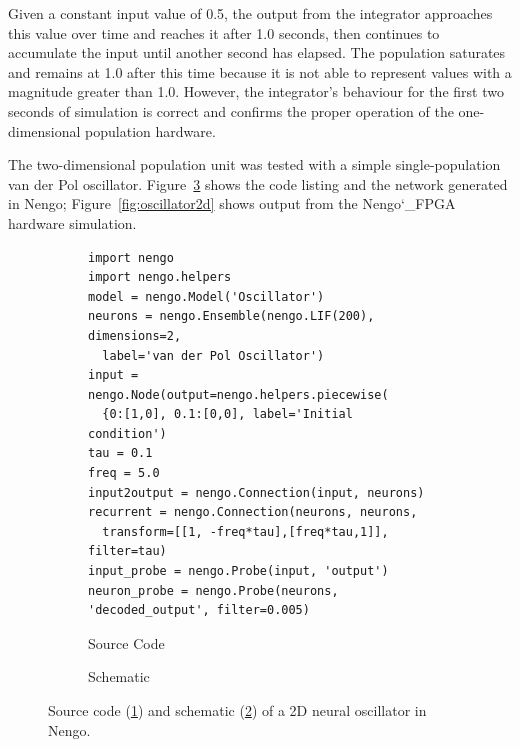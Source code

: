 \documentclass[english]{article}
\newcommand{\design}{Nengo\char`_FPGA}  %
\begin{document}
Given a constant input value of 0.5, the output from the integrator approaches this value
over time and reaches it after 1.0 seconds, then continues to accumulate the input until
another second has elapsed. The population saturates and remains at 1.0 after this time
because it is not able to represent values with a magnitude greater than 1.0. However,
the integrator's behaviour for the first two seconds of simulation is correct and confirms
the proper operation of the one-dimensional population hardware.

The two-dimensional population unit was tested with a simple single-population van der Pol oscillator.
Figure~\ref{lst:oscillator2d} shows the code listing and the network generated in Nengo;
Figure~\ref{fig:oscillator2d} shows output from the \design{} hardware simulation.

\begin{figure}
\centering

\begin{subfigure}[a]{\textwidth}
\centering
\lstset{language=Python}
\begin{lstlisting}[frame=single]
import nengo
import nengo.helpers
model = nengo.Model('Oscillator')
neurons = nengo.Ensemble(nengo.LIF(200), dimensions=2, 
  label='van der Pol Oscillator')
input = nengo.Node(output=nengo.helpers.piecewise(
  {0:[1,0], 0.1:[0,0], label='Initial condition')
tau = 0.1
freq = 5.0
input2output = nengo.Connection(input, neurons)
recurrent = nengo.Connection(neurons, neurons, 
  transform=[[1, -freq*tau],[freq*tau,1]], filter=tau)
input_probe = nengo.Probe(input, 'output')
neuron_probe = nengo.Probe(neurons, 'decoded_output', filter=0.005)
\end{lstlisting}
\caption{Source Code}
\label{lst:oscillator2d:code}
\end{subfigure}

\begin{subfigure}[b]{0.3\textwidth}
\centering
\caption{Schematic}
\label{lst:oscillator2d:schematic}
\end{subfigure}

\caption[A 2D neural oscillator in Nengo.]
{Source code (\ref{lst:oscillator2d:code}) and schematic (\ref{lst:oscillator2d:schematic})
of a 2D neural oscillator in Nengo.}
\label{lst:oscillator2d}
\end{figure}
\end{document}

